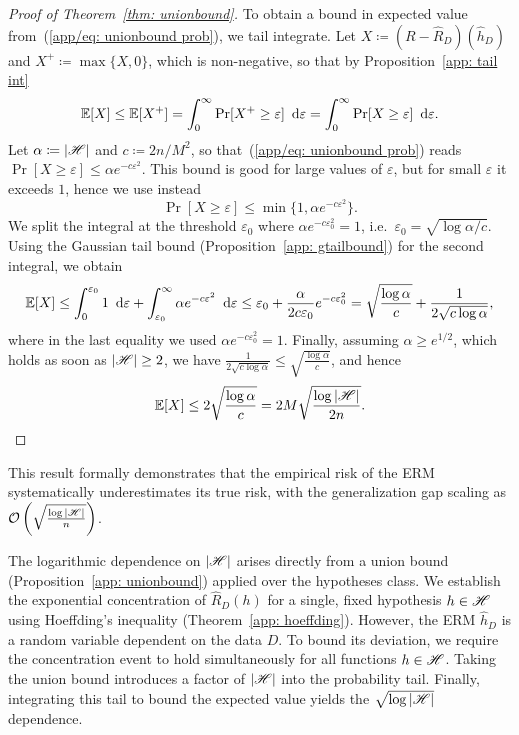 \documentclass[reqno]{amsart}
\begin{document}
\begin{theorem}
\begin{proof}[Proof of Theorem~\ref{thm: unionbound}]
To obtain a bound in expected value from~(\ref{app/eq: unionbound prob}), we tail integrate. Let $X\coloneq(R-\hat R_D)(\hat h_D)$ and $X^+\coloneq\max\{X,0\}$, which is non-negative, so that by Proposition~\ref{app: tail int}
\[
\mathbb{E}[X] \le \mathbb{E}[X^+] = \int_0^\infty \Pr[X^+\ge\varepsilon]\mathop{}\!\,\,\mathrm{d}\varepsilon = \int_0^\infty \Pr[X\ge\varepsilon]\mathop{}\!\,\,\mathrm{d}\varepsilon.
\]
Let $\alpha\coloneq\vert\mathscr{H}\vert$ and $c\coloneq 2n/M^2$, so that~(\ref{app/eq: unionbound prob}) reads $\Pr[X\ge\varepsilon]\le\alpha e^{-c\varepsilon^2}$. This bound is good for large values of $\varepsilon$, but for small $\varepsilon$ it exceeds $1$, hence we use instead
\[
\Pr[X\ge\varepsilon] \le \min\{1,\alpha e^{-c\varepsilon^2}\}.
\]
We split the integral at the threshold $\varepsilon_0$ where $\alpha e^{-c\varepsilon_0^2} = 1$, i.e.\ $\varepsilon_0 = \sqrt{\log\alpha/c}$. Using the Gaussian tail bound (Proposition~\ref{app: gtailbound}) for the second integral, we obtain
\[
\mathbb{E}[X] \le \int_0^{\varepsilon_0} 1\mathop{}\!\,\,\mathrm{d}\varepsilon + \int_{\varepsilon_0}^\infty \alpha e^{-c\varepsilon^2}\mathop{}\!\,\,\mathrm{d}\varepsilon
\le \varepsilon_0 + \frac{\alpha}{2c\varepsilon_0}e^{-c\varepsilon_0^2}
= \sqrt{\frac{\log\alpha}{c}} + \frac{1}{2\sqrt{c\log\alpha}},
\]
where in the last equality we used $\alpha e^{-c\varepsilon_0^2}=1$. Finally, assuming $\alpha\ge e^{1/2}$, which holds as soon as $\vert\mathscr{H}\vert\ge 2$, we have $\frac{1}{2\sqrt{c\log\alpha}}\le\sqrt{\frac{\log\alpha}{c}}$, and hence
\[
\mathbb{E}[X] \le 2\sqrt{\frac{\log\alpha}{c}} = 2M\sqrt{\frac{\log\vert\mathscr{H}\vert}{2n}}.
\]
\end{proof}
\end{theorem}

This result formally demonstrates that the empirical risk of the ERM systematically underestimates its true risk, with the generalization gap scaling as $\mathcal{O}\left(\sqrt{\frac{\log \vert\mathscr{H}\vert}{n}}\right)$.

The logarithmic dependence on $\vert\mathscr{H}\vert$ arises directly from a union bound (Proposition~\ref{app: unionbound}) applied over the hypotheses class. We establish the exponential concentration of $\hat{R}_D(h)$ for a single, fixed hypothesis $h \in \mathscr{H}$ using Hoeffding's inequality (Theorem~\ref{app: hoeffding}). However, the ERM $\hat{h}_D$ is a random variable dependent on the data $D$. To bound its deviation, we require the concentration event to hold simultaneously for all functions $h \in \mathscr{H}$. Taking the union bound introduces a factor of $\vert\mathscr{H}\vert$ into the probability tail. Finally, integrating this tail to bound the expected value yields the $\sqrt{\log \vert\mathscr{H}\vert}$ dependence. 
\end{document}
